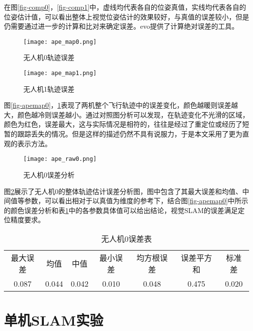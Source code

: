 在图\ref{fig-comp0}，\ref{fig-comp1}中，虚线均代表各自的位姿真值，实线均代表各自的位姿估计值，可以看出整体上视觉位姿估计的效果较好，与真值的误差较小，但是仍需要通过进一步的计算和比对来确定误差。evo提供了计算绝对误差的工具。
~\\
\begin{figure}[htbp]
	\centering
	\begin{minipage}[t]{0.45\columnwidth} %
		\centering
		\texttt{[image: ape\_map0.png]}
		\caption{无人机0轨迹误差}
		\label{fig-apemap0}
	\end{minipage}
	\begin{minipage}[t]{0.45\columnwidth}
		\centering
		\texttt{[image: ape\_map1.png]}
		\caption{无人机1轨迹误差}
		\label{fig-apemap1}
	\end{minipage}
\end{figure}

图\ref{fig-apemap0}，\ref{fig-apemap1}表现了两机整个飞行轨迹中的误差变化，颜色越暖则误差越大，颜色越冷则误差越小。通过对照图分析可以发现，在轨迹变化不光滑的区域，颜色为红色，误差最大，这与实际情况是相符的，往往是经过了重定位或经历了短暂的跟踪丢失的情况。但是这样的描述仍然不具有说服力，于是本文采用了更为直观的表示方法。

\begin{figure}[!ht]
	\centering
	\texttt{[image: ape\_raw0.png]}
	\caption{无人机0误差分析}
	\label{fig-aperaw0}
\end{figure}

图\ref{fig-aperaw0}展示了无人机0的整体轨迹估计误差分析图，图中包含了其最大误差和均值、中间值等参数，可以看出相对于以真值为维度的参考下，结合图\ref{fig-apemap0}中所示的颜色误差分析和表\ref{error-euroc}中的各参数具体值可以给出结论，视觉SLAM的误差满足定位精度要求。

\begin{table}[!htbp]
	\centering
	\caption{无人机0误差表}\label{error-euroc}%
	\begin{tabular}{ccccccc}
		\toprule
		
		最大误差 & 均值 & 中值 & 最小误差 & 均方根误差 & 误差平方和 & 标准差\\
		0.087 & 0.044 & 0.042 &  0.010 & 0.048 & 0.475 & 0.020\\
		
		\bottomrule
	\end{tabular}
\end{table}

\section{单机SLAM实验}

